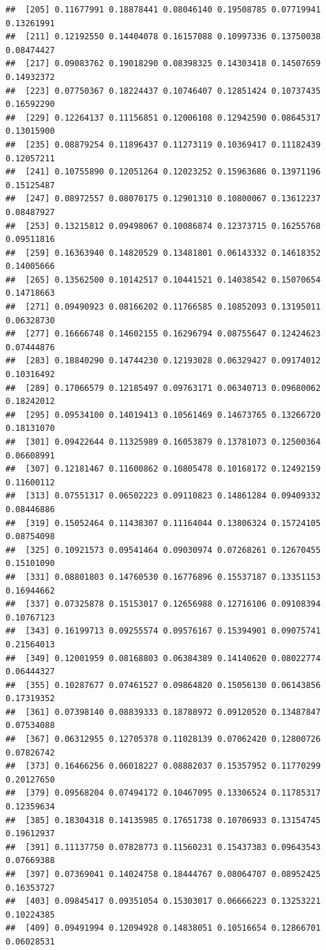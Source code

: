 \documentclass[
]{article}
\begin{document}
\begin{verbatim}
##  [205] 0.11677991 0.18878441 0.08046140 0.19508785 0.07719941 0.13261991
##  [211] 0.12192550 0.14404078 0.16157088 0.10997336 0.13750038 0.08474427
##  [217] 0.09083762 0.19018290 0.08398325 0.14303418 0.14507659 0.14932372
##  [223] 0.07750367 0.18224437 0.10746407 0.12851424 0.10737435 0.16592290
##  [229] 0.12264137 0.11156851 0.12006108 0.12942590 0.08645317 0.13015900
##  [235] 0.08879254 0.11896437 0.11273119 0.10369417 0.11182439 0.12057211
##  [241] 0.10755890 0.12051264 0.12023252 0.15963686 0.13971196 0.15125487
##  [247] 0.08972557 0.08070175 0.12901310 0.10800067 0.13612237 0.08487927
##  [253] 0.13215812 0.09498067 0.10086874 0.12373715 0.16255768 0.09511816
##  [259] 0.16363940 0.14820529 0.13481801 0.06143332 0.14618352 0.14005666
##  [265] 0.13562500 0.10142517 0.10441521 0.14038542 0.15070654 0.14718663
##  [271] 0.09490923 0.08166202 0.11766585 0.10852093 0.13195011 0.06328730
##  [277] 0.16666748 0.14602155 0.16296794 0.08755647 0.12424623 0.07444876
##  [283] 0.18840290 0.14744230 0.12193028 0.06329427 0.09174012 0.10316492
##  [289] 0.17066579 0.12185497 0.09763171 0.06340713 0.09680062 0.18242012
##  [295] 0.09534100 0.14019413 0.10561469 0.14673765 0.13266720 0.18131070
##  [301] 0.09422644 0.11325989 0.16053879 0.13781073 0.12500364 0.06608991
##  [307] 0.12181467 0.11600862 0.10805478 0.10168172 0.12492159 0.11600112
##  [313] 0.07551317 0.06502223 0.09110823 0.14861284 0.09409332 0.08446886
##  [319] 0.15052464 0.11438307 0.11164044 0.13806324 0.15724105 0.08754098
##  [325] 0.10921573 0.09541464 0.09030974 0.07268261 0.12670455 0.15101090
##  [331] 0.08801803 0.14760530 0.16776896 0.15537187 0.13351153 0.16944662
##  [337] 0.07325878 0.15153017 0.12656988 0.12716106 0.09108394 0.10767123
##  [343] 0.16199713 0.09255574 0.09576167 0.15394901 0.09075741 0.21564013
##  [349] 0.12001959 0.08168803 0.06384389 0.14140620 0.08022774 0.06444327
##  [355] 0.10287677 0.07461527 0.09864820 0.15056130 0.06143856 0.17319352
##  [361] 0.07398140 0.08839333 0.18788972 0.09120520 0.13487847 0.07534088
##  [367] 0.06312955 0.12705378 0.11028139 0.07062420 0.12800726 0.07826742
##  [373] 0.16466256 0.06018227 0.08882037 0.15357952 0.11770299 0.20127650
##  [379] 0.09568204 0.07494172 0.10467095 0.13306524 0.11785317 0.12359634
##  [385] 0.18304318 0.14135985 0.17651738 0.10706933 0.13154745 0.19612937
##  [391] 0.11137750 0.07828773 0.11560231 0.15437383 0.09643543 0.07669388
##  [397] 0.07369041 0.14024758 0.18444767 0.08064707 0.08952425 0.16353727
##  [403] 0.09845417 0.09351054 0.15303017 0.06666223 0.13253221 0.10224385
##  [409] 0.09491994 0.12094928 0.14838051 0.10516654 0.12866701 0.06028531

\end{verbatim}
\end{document}
